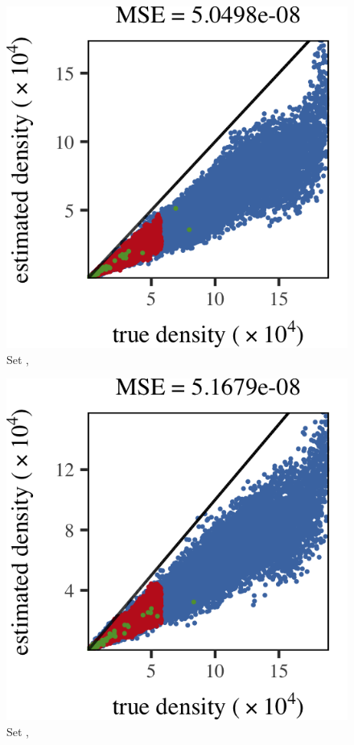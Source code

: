\subfigvspace
\begin{subfigure}{0.33\textwidth}
	\centering
	\includegraphics[keepaspectratio=true, width=\textwidth, height=0.185\textheight]{result/img/results_ferdosi_2_60000_sambe_silverman}
	\caption{Set \ferdosiTwo, \sambe}
	\label{fig:results:multisphere:sambe:ferdosi2}
\end{subfigure}
\begin{subfigure}{0.33\textwidth}
	\centering
	\includegraphics[keepaspectratio=true, width=\textwidth, height=0.185\textheight]{result/img/results_baakman_2_60000_sambe_silverman}
	\caption{Set \baakmanTwo, \sambe}
	\label{fig:results:multisphere:sambe:baakman2}
\end{subfigure}